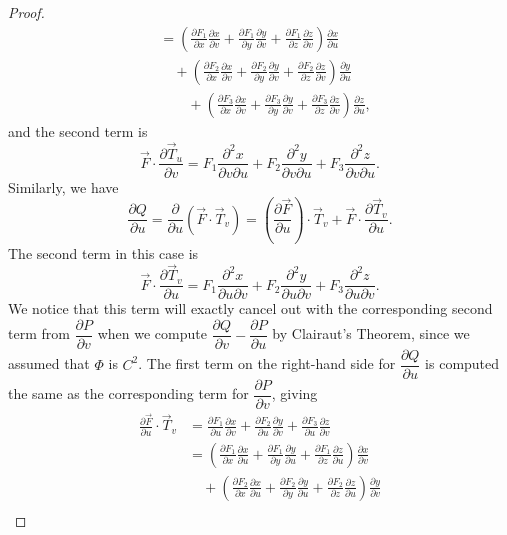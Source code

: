 \documentclass[12pt,letterpaper]{article}
\begin{document}
\begin{proof}
\begin{align*}
& = \left(\frac{\partial F_1}{\partial x}\frac{\partial x}{\partial v}+\frac{\partial F_1}{\partial y}\frac{\partial y}{\partial v}+\frac{\partial F_1}{\partial z}\frac{\partial z}{\partial v}\right)\frac{\partial x}{\partial u}\\
& \quad + \left(\frac{\partial F_2}{\partial x}\frac{\partial x}{\partial v}+\frac{\partial F_2}{\partial y}\frac{\partial y}{\partial v}+\frac{\partial F_2}{\partial z}\frac{\partial z}{\partial v}\right)\frac{\partial y}{\partial u}\\
& \quad\quad + \left(\frac{\partial F_3}{\partial x}\frac{\partial x}{\partial v}+\frac{\partial F_3}{\partial y}\frac{\partial y}{\partial v}+\frac{\partial F_3}{\partial z}\frac{\partial z}{\partial v}\right)\frac{\partial z}{\partial u},
\end{align*}
and the second term is
\[
 \vec{F}\cdot \frac{\partial \vec{T}_u}{\partial v} = F_1\frac{\partial^2x}{\partial v\partial u}+F_2\frac{\partial^2y}{\partial v\partial u}+F_3\frac{\partial^2z}{\partial v\partial u}.
\]
Similarly, we have
\[
 \frac{\partial Q}{\partial u} = \frac{\partial}{\partial u}\left(\vec{F}\cdot \vec{T}_v\right) = \left(\frac{\partial \vec{F}}{\partial u}\right)\cdot \vec{T}_v+\vec{F}\cdot \frac{\partial \vec{T}_v}{\partial u}.
\]
The second term in this case is
\[
 \vec{F}\cdot \frac{\partial \vec{T}_v}{\partial u} = F_1\frac{\partial^2x}{\partial u\partial v}+F_2\frac{\partial^2y}{\partial u\partial v}+F_3\frac{\partial^2z}{\partial u\partial v}.
\]
We notice that this term will exactly cancel out with the corresponding second term from $\dfrac{\partial P}{\partial v}$ when we compute $\dfrac{\partial Q}{\partial v}-\dfrac{\partial P}{\partial u}$ by Clairaut's Theorem, since we assumed that $\Phi$ is $C^2$. The first term on the right-hand side for $\dfrac{\partial Q}{\partial u}$ is computed the same as the corresponding term for $\dfrac{\partial P}{\partial v}$, giving
\begin{align*}
 \frac{\partial \vec{F}}{\partial u}\cdot \vec{T}_v & = \frac{\partial F_1}{\partial u}\frac{\partial x}{\partial v}+\frac{\partial F_2}{\partial u}\frac{\partial y}{\partial v}+\frac{\partial F_3}{\partial u}\frac{\partial z}{\partial v}\\
& = \left(\frac{\partial F_1}{\partial x}\frac{\partial x}{\partial u}+\frac{\partial F_1}{\partial y}\frac{\partial y}{\partial u}+\frac{\partial F_1}{\partial z}\frac{\partial z}{\partial u}\right)\frac{\partial x}{\partial v}\\
& \quad + \left(\frac{\partial F_2}{\partial x}\frac{\partial x}{\partial u}+\frac{\partial F_2}{\partial y}\frac{\partial y}{\partial u}+\frac{\partial F_2}{\partial z}\frac{\partial z}{\partial u}\right)\frac{\partial y}{\partial v}\\

\end{align*}
\end{proof}
\end{document}
